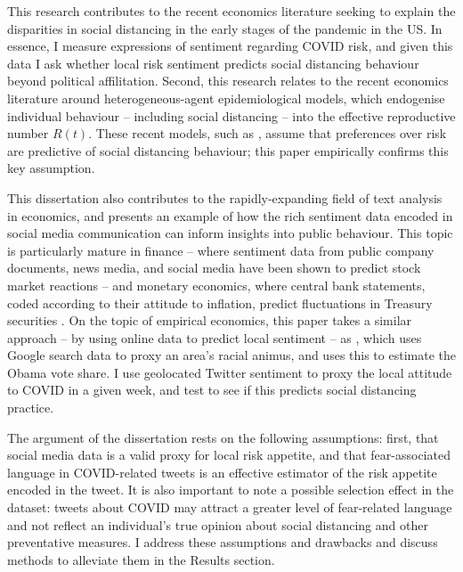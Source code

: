 \documentclass{article}
\begin{document}
This research contributes to the recent economics literature seeking to explain the disparities in social distancing in the early stages of the pandemic in the US.  In essence, I measure expressions of sentiment regarding COVID risk, and given this data I ask whether local risk sentiment predicts social distancing behaviour beyond political affilitation. Second, this research relates to the recent economics literature around heterogeneous-agent epidemiological models, which endogenise individual behaviour -- including social distancing -- into the effective reproductive number \(R(t)\). These recent models, such as \textcite{acemogluTestingVoluntarySocial2020,brotherhoodEconomicModelCOVID192020,eichenbaumMacroeconomicsEpidemics2020}, assume that preferences over risk are predictive of social distancing behaviour; this paper empirically confirms this key assumption.

This dissertation also contributes to the rapidly-expanding field of text analysis in economics, and presents an example of how the rich sentiment data encoded in social media communication can inform insights into public behaviour. This topic is particularly mature in finance -- where sentiment data from public company documents, news media, and social media have been shown to predict stock market reactions \parencite{bollenTwitterMoodPredicts2011} -- and monetary economics, where central bank statements, coded according to their attitude to inflation, predict fluctuations in Treasury securities \parencite{luccaMeasuringCentralBank2009,gentzkowTextData2019}. On the topic of empirical economics, this paper takes a similar approach -- by using online data to predict local sentiment -- as \textcite{stephens-davidowitzCostRacialAnimus2014}, which uses Google search data to proxy an area's racial animus, and uses this to estimate the Obama vote share. I use geolocated Twitter sentiment to proxy the local attitude to COVID in a given week, and test to see if this predicts social distancing practice. 

The argument of the dissertation rests on the following assumptions: first, that social media data is a valid proxy for local risk appetite, and that fear-associated language in COVID-related tweets is an effective estimator of the risk appetite encoded in the tweet. It is also important to note a possible selection effect in the dataset: tweets about COVID may attract a greater level of fear-related language and not reflect an individual's true opinion about social distancing and other preventative measures. I address these assumptions and drawbacks and discuss methods to alleviate them in the Results section.
\end{document}
